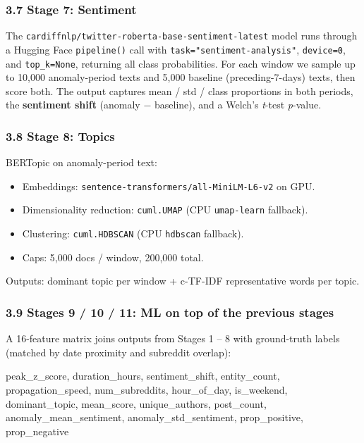 \documentclass[
]{article}
\newenvironment{Shaded}{}{}
\newcommand{\NormalTok}[1]{#1}
\begin{document}
\subsubsection{3.7 Stage 7: Sentiment}

The \texttt{cardiffnlp/twitter-roberta-base-sentiment-latest} model runs
through a Hugging Face \texttt{pipeline()} call with
\texttt{task="sentiment-analysis"}, \texttt{device=0}, and
\texttt{top\_k=None}, returning all class probabilities. For each window
we sample up to 10,000 anomaly-period texts and 5,000 baseline
(preceding-7-days) texts, then score both. The output captures mean /
std / class proportions in both periods, the \textbf{sentiment shift}
(anomaly $-$ baseline), and a Welch's \emph{t}-test \emph{p}-value.

\subsubsection{3.8 Stage 8: Topics}

BERTopic on anomaly-period text:

\begin{itemize}
\item
  Embeddings: \texttt{sentence-transformers/all-MiniLM-L6-v2} on GPU.
\item
  Dimensionality reduction: \texttt{cuml.UMAP} (CPU \texttt{umap-learn}
  fallback).
\item
  Clustering: \texttt{cuml.HDBSCAN} (CPU \texttt{hdbscan} fallback).
\item
  Caps: 5,000 docs / window, 200,000 total.
\end{itemize}

Outputs: dominant topic per window + c-TF-IDF representative words per
topic.

\subsubsection{3.9 Stages 9 / 10 / 11: ML on top of the previous
stages}\label{39-stages-9--10--11-----ml-on-top-of-the-previous-stages}

A 16-feature matrix joins outputs from Stages 1 -- 8 with ground-truth
labels (matched by date proximity and subreddit overlap):

\begin{Shaded}
\begin{Highlighting}[]
\NormalTok{peak\_z\_score, duration\_hours, sentiment\_shift, entity\_count,}
\NormalTok{propagation\_speed, num\_subreddits, hour\_of\_day, is\_weekend,}
\NormalTok{dominant\_topic, mean\_score, unique\_authors, post\_count,}
\NormalTok{anomaly\_mean\_sentiment, anomaly\_std\_sentiment,}
\NormalTok{prop\_positive, prop\_negative}
\end{Highlighting}
\end{Shaded}
\end{document}
